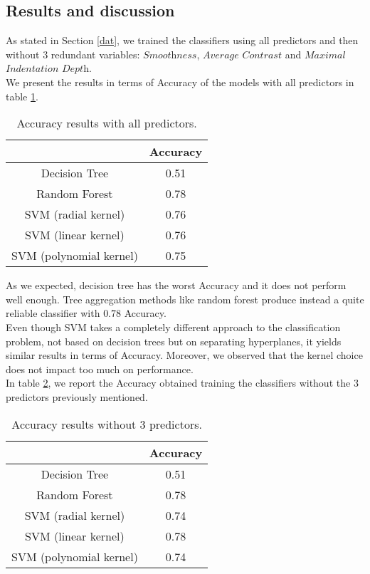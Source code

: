 \documentclass{article}
\begin{document}
\subsection{Results and discussion}
As stated in Section \ref{dat}, we trained the classifiers using all predictors and then without $3$ redundant variables: $\textit{Smoothness}$, $\textit{Average Contrast}$ and $\textit{Maximal}$ $\textit{Indentation Depth}$. 
\\We present the results in terms of Accuracy of the models with all predictors in table \ref{table1}. 
\begin{table}[ht]
 \centering
\begin{tabular}{ |c|c|} \hline
 & Accuracy \\
\hline
Decision Tree & 0.51 \\ 
\hline
 Random Forest & 0.78  \\ 
\hline
 SVM (radial kernel) & 0.76 \\ 
\hline
 SVM (linear kernel) & 0.76 \\ 
\hline
 SVM (polynomial kernel) & 0.75 \\ 
\hline
\end{tabular}
\caption{Accuracy results with all predictors.}\label{table1}
\end{table}

As we expected, decision tree has the worst Accuracy and it does not perform well enough. Tree aggregation methods like random forest produce instead a quite reliable classifier with $0.78$ Accuracy. 
\\Even though SVM takes a completely different approach to the classification problem, not based on decision trees but on separating hyperplanes, it yields similar results in terms of Accuracy. Moreover, we observed that the kernel choice does not impact too much on performance.
\\In table \ref{table2}, we report the Accuracy obtained training the classifiers without the $3$ predictors previously mentioned.
\newpage

\begin{table}[ht]
 \centering
\begin{tabular}{ |c|c|} \hline
 &  Accuracy \\
\hline
Decision Tree & 0.51 \\ 
\hline
 Random Forest & 0.78 \\ 
\hline
 SVM (radial kernel) & 0.74 \\ 
\hline
 SVM (linear kernel) & 0.78  \\ 
\hline
 SVM (polynomial kernel) & 0.74 \\ 
\hline
\end{tabular}
\caption{Accuracy results without $3$ predictors.}\label{table2}
\end{table}
\end{document}
